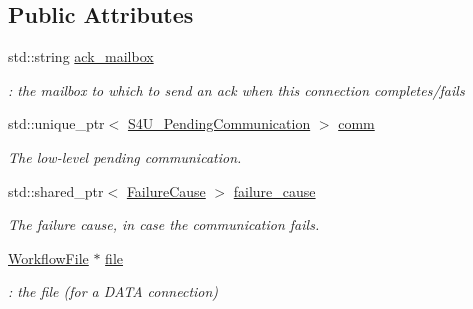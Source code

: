\subsection*{Public Attributes}
\begin{DoxyCompactItemize}
\item 
\mbox{\label{classwrench_1_1_network_connection_a4e3dbf246b8eda864e7fed9900e93471}} 
std\+::string \hyperlink{classwrench_1_1_network_connection_a4e3dbf246b8eda864e7fed9900e93471}{ack\+\_\+mailbox}
\begin{DoxyCompactList}\small\item\em \+: the mailbox to which to send an ack when this connection completes/fails \end{DoxyCompactList}\item 
\mbox{\label{classwrench_1_1_network_connection_ad4ab7cbfdb85333144ec006e5118accd}} 
std\+::unique\+\_\+ptr$<$ \hyperlink{classwrench_1_1_s4_u___pending_communication}{S4\+U\+\_\+\+Pending\+Communication} $>$ \hyperlink{classwrench_1_1_network_connection_ad4ab7cbfdb85333144ec006e5118accd}{comm}
\begin{DoxyCompactList}\small\item\em The low-\/level pending communication. \end{DoxyCompactList}\item 
\mbox{\label{classwrench_1_1_network_connection_aed68c9fd5a710be17a6a78316da2ee12}} 
std\+::shared\+\_\+ptr$<$ \hyperlink{classwrench_1_1_failure_cause}{Failure\+Cause} $>$ \hyperlink{classwrench_1_1_network_connection_aed68c9fd5a710be17a6a78316da2ee12}{failure\+\_\+cause}
\begin{DoxyCompactList}\small\item\em The failure cause, in case the communication fails. \end{DoxyCompactList}\item 
\mbox{\label{classwrench_1_1_network_connection_af0885a0be98dc068805adf6a53ace993}} 
\hyperlink{classwrench_1_1_workflow_file}{Workflow\+File} $\ast$ \hyperlink{classwrench_1_1_network_connection_af0885a0be98dc068805adf6a53ace993}{file}
\begin{DoxyCompactList}\small\item\em \+: the file (for a D\+A\+TA connection) \end{DoxyCompactList}\item 

\end{DoxyCompactItemize}
